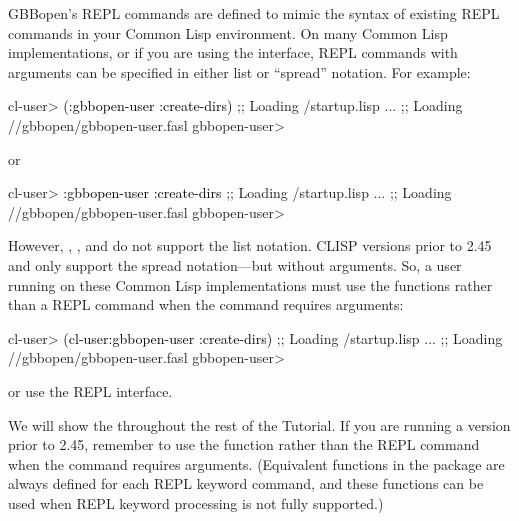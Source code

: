 \documentclass[10pt,twoside,english,pdftex]{article}
\begin{document}
GBBopen's REPL commands are defined to mimic the syntax of existing REPL
commands in your Common Lisp environment.  On many Common Lisp
implementations, or if you are using the
 interface, REPL
commands with arguments can be specified in either list or ``spread''
notation.  For example:
%
\W\supp
\begin{example}
\textcolor{darkergray}{%
  cl-user> \textcolor{black}{(:gbbopen-user :create-dirs)}
  ;; Loading /startup.lisp
     ...
  ;; Loading //gbbopen/gbbopen-user.fasl
  gbbopen-user>}
\end{example}
%
or
%
\W\supp\notpretop
\begin{example}
\textcolor{darkergray}{%
  cl-user> \textcolor{black}{:gbbopen-user :create-dirs}
  ;; Loading /startup.lisp
     ...
  ;; Loading //gbbopen/gbbopen-user.fasl
  gbbopen-user>}
\end{example}

However, ,
, and
 do not support the list
notation.  CLISP versions prior to 2.45 and
 only support the spread
notation---but without arguments.  So, a user running on these Common Lisp
implementations must use the  functions rather
than a REPL command when the command requires arguments:
%
\W\supp
\begin{example}
\textcolor{darkergray}{%
  cl-user> \textcolor{black}{(cl-user:gbbopen-user :create-dirs)}
  ;; Loading /startup.lisp
     ...
  ;; Loading //gbbopen/gbbopen-user.fasl
  gbbopen-user>}
\end{example}
%
or use the  REPL
interface.

We will show the 
throughout the rest of the Tutorial.  If you are running a
 version prior to 2.45, remember to
use the  function rather than the REPL command when
the command requires arguments.  (Equivalent functions in the
 package are always defined for each REPL
keyword command, and these functions can be used when REPL keyword
processing is not fully supported.)
\end{document}
